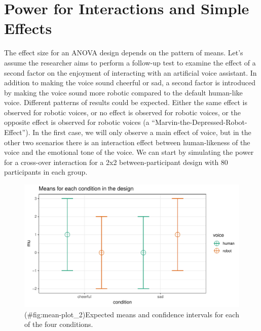 \documentclass[,man,floatsintext]{apa6}
\begin{document}
\section{Power for Interactions and Simple
Effects}\label{power-for-interactions-and-simple-effects}

The effect size for an ANOVA design depends on the pattern of means.
Let's assume the researcher aims to perform a follow-up test to examine
the effect of a second factor on the enjoyment of interacting with an
artificial voice assistant. In addition to making the voice sound
cheerful or sad, a second factor is introduced by making the voice sound
more robotic compared to the default human-like voice. Different
patterns of results could be expected. Either the same effect is
observed for robotic voices, or no effect is observed for robotic
voices, or the opposite effect is observed for robotic voices (a
\enquote{Marvin-the-Depressed-Robot-Effect}). In the first case, we will
only observe a main effect of voice, but in the other two scenarios
there is an interaction effect between human-likeness of the voice and
the emotional tone of the voice. We can start by simulating the power
for a cross-over interaction for a 2x2 between-participant design with
80 participants in each group.

\begin{figure}
\centering
\includegraphics{0.1_Simulation_Based_Power_Analysis_For_Factorial_ANOVA_Designs_files/figure-latex/mean-plot_2-1.pdf}
\caption{(\#fig:mean-plot\_2)Expected means and confidence intervals for
each of the four conditions.}
\end{figure}
\end{document}
